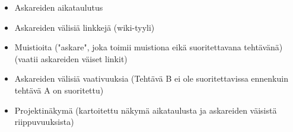 ﻿\documentclass[finnish]{article}
\begin{document}
\begin{itemize}
  \item Askareiden aikataulutus
  \item Askareiden välisiä linkkejä (wiki-tyyli)
  \item Muistioita ("askare", joka toimii muistiona eikä suoritettavana tehtävänä) (vaatii askareiden väiset linkit)
  \item Askareiden välisiä vaativuuksia (Tehtävä B ei ole suoritettavissa ennenkuin tehtävä A on suoritettu)
  \item Projektinäkymä (kartoitettu näkymä aikataulusta ja askareiden väisistä riippuvuuksista)
\end{itemize}
\end{document}
